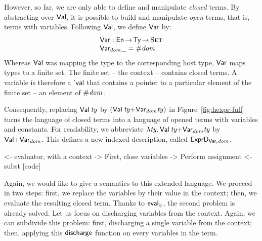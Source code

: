 However, so far, we are only able to define and manipulate
\emph{closed} terms. By abstracting over $\SYMBVal$, it is possible to
build and manipulate \emph{open} terms, that is, terms with
variables. Following $\SYMBVal$, we define $\SYMBVar$ by:
%
\[\stk{
\Var{}{} : \EnumU \To \Ty \To \Set \\
\Var{\V{dom}}{\_} = \EnumT{\V{dom}}
}\]
%
Whereas $\SYMBVal$ was mapping the type to the corresponding host type,
$\SYMBVar$ maps types to a finite set. The finite set -- the context
-- contains closed terms. A variable is therefore a $\SYMBEval$ that
contains a pointer to a particular element of the finite set -- an
element of $\EnumT{\V{dom}}$. 

Consequently, replacing $\Val{\V{ty}}$ by
$(\SUM{\Val{\V{ty}}}{\Var{\V{dom}}{\V{ty}}})$ in
Figure~\ref{fig:hexpr-full} turns the language of closed terms into a
language of opened terms with variables and constants. For
readability, we abbreviate $\LAM{\V{ty}}
\SUM{\Val{\V{ty}}}{\Var{\V{dom}}{\V{ty}}}$ by
$\SUM{\SYMBVal}{\Var{\V{dom}}{}}$.  This defines a new indexed description,
called $\HExprVarD{\V{dom}}$.

\begin{wstructure}
        <- evaluator, with a context
            -> First, close variables
                -> Perform assignment
                <- subst [code]
\end{wstructure}

\newcommand{\discharge}{\F{discharge}}

Again, we would like to give a semantics to this extended language. We
proceed in two steps: first, we replace the variables by their value
in the context; then, we evaluate the resulting closed term. Thanks to
$\evalH$, the second problem is already solved. Let us focus on
discharging variables from the context. Again, we can subdivide this
problem: first, discharging a single variable from the context; then,
applying this $\discharge$ function on every variables in the term.

